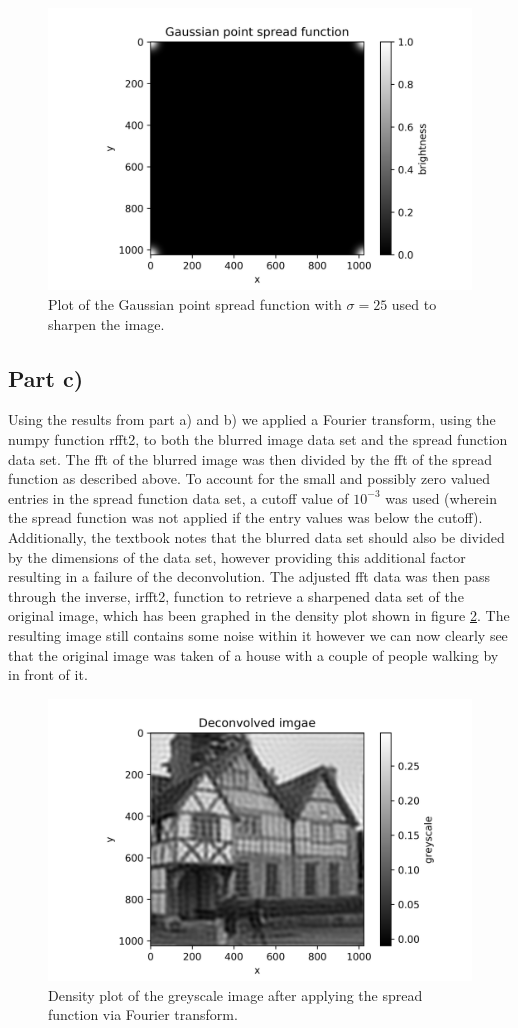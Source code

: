 \documentclass{article}
\begin{document}
\begin{figure}[H]
	\centering
	\includegraphics{../images/spread_function.png}
	\caption{Plot of the Gaussian point spread function with $\sigma=25$ used to sharpen the image.}
	\label{fig:spread_func}	
\end{figure}

\subsection{Part c)}
Using the results from part a) and b) we applied a Fourier transform, using the numpy function rfft2, to both the blurred image data set and the spread function data set.
The fft of the blurred image was then divided by the fft of the spread function as described above. To account for the small and possibly zero valued entries in the spread function data set, a cutoff value of $10^{-3}$ was used (wherein the spread function was not applied if the entry values was below the cutoff). Additionally, the textbook notes that the blurred data set should also be divided by the dimensions of the data set, however providing this additional factor resulting in a failure of the deconvolution.
The adjusted fft data was then pass through the inverse, irfft2, function to retrieve a sharpened data set of the original image, which has been graphed in the density plot shown in figure \ref{fig:deconvolved_image}. The resulting image still contains some noise within it however we can now clearly see that the original image was taken of a house with a couple of people walking by in front of it. 

\begin{figure}[H]
	\centering
	\includegraphics{../images/deconvolved_image.png}
	\caption{Density plot of the greyscale image after applying the spread function via Fourier transform.}
	\label{fig:deconvolved_image}	
\end{figure}
\end{document}
